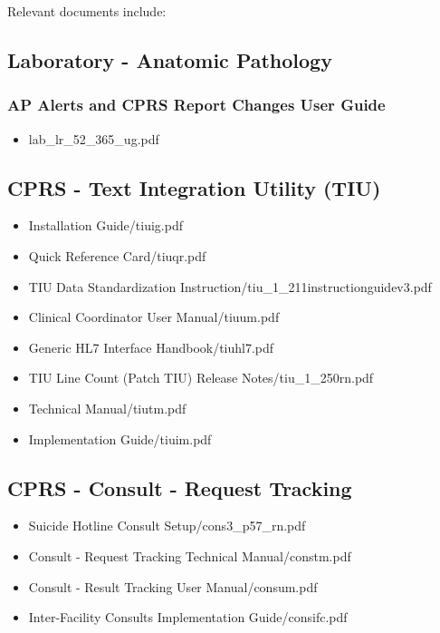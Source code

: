 \documentclass{OSEHRAArticle}
\begin{document}
Relevant documents include:

\subsection{Laboratory - Anatomic Pathology}

\subsubsection{AP Alerts and CPRS Report Changes User Guide}

\begin{itemize}
\item lab\_lr\_52\_365\_ug.pdf
\end{itemize}

\subsection{CPRS -  Text Integration Utility (TIU)}

\begin{itemize}
\item Installation Guide/tiuig.pdf
\item Quick Reference Card/tiuqr.pdf
\item TIU Data Standardization Instruction/tiu\_1\_211instructionguidev3.pdf
\item Clinical Coordinator  User Manual/tiuum.pdf
\item Generic HL7 Interface Handbook/tiuhl7.pdf
\item TIU Line Count (Patch TIU) Release Notes/tiu\_1\_250rn.pdf
\item Technical Manual/tiutm.pdf
\item Implementation Guide/tiuim.pdf
\end{itemize}


\subsection{CPRS  - Consult - Request Tracking}

\begin{itemize}
\item Suicide Hotline Consult Setup/cons3\_p57\_rn.pdf
\item Consult - Request Tracking Technical Manual/constm.pdf
\item Consult - Result Tracking User Manual/consum.pdf
\item Inter-Facility Consults Implementation Guide/consifc.pdf
\end{itemize}
\end{document}
